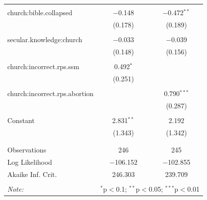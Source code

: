 \documentclass[12pt,letterpaper]{article}
\begin{document}
\begin{description}
\begin{table}[H]
\begin{tabular}{@{\extracolsep{5pt}}lcc}
		& & \\ 
		church:bible.collapsed & $-$0.148 & $-$0.472$^{**}$ \\ 
		& (0.178) & (0.189) \\ 
		& & \\ 
		secular.knowledge:church & $-$0.033 & $-$0.039 \\ 
		& (0.148) & (0.156) \\ 
		& & \\ 
		church:incorrect.rps.ssm & 0.492$^{*}$ &  \\ 
		& (0.251) &  \\ 
		& & \\ 
		church:incorrect.rps.abortion &  & 0.790$^{***}$ \\ 
		&  & (0.287) \\ 
		& & \\ 
		Constant & 2.831$^{**}$ & 2.192 \\ 
		& (1.343) & (1.342) \\ 
		& & \\ 
		\hline \\[-1.8ex] 
		Observations & 246 & 245 \\ 
		Log Likelihood & $-$106.152 & $-$102.855 \\ 
		Akaike Inf. Crit. & 246.303 & 239.709 \\ 
		\hline 
		\hline \\[-1.8ex] 
		\textit{Note:}  & \multicolumn{2}{r}{$^{*}$p$<$0.1; $^{**}$p$<$0.05; $^{***}$p$<$0.01} \\ 
	\end{tabular} 
\end{table} 
\end{description}
\clearpage
\end{document}
